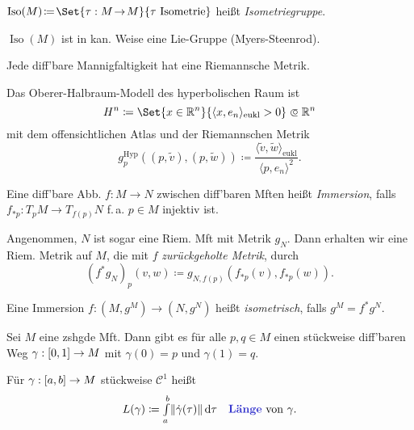 \documentclass{cheat-sheet}
\newcommand{\abinterval}{\cinterval{a}{b}} %
\DeclareMathOperator{\Iso}{Iso} %
\newcommand{\Cont}{\mathcal{C}} %
\begin{document}
\begin{defn}
  $\Iso(M) \!\coloneqq\! \Set{ \tau : M \!\to\! M }{ \tau \text{ Isometrie} }$ heißt \emph{Isometriegruppe}.
\end{defn}

\begin{bem}
  $\Iso(M)$ ist in kan. Weise eine Lie-Gruppe (Myers-Steenrod).
\end{bem}

\begin{satz}
  Jede diff'bare Mannigfaltigkeit hat eine Riemannsche Metrik.
\end{satz}

\begin{bsp}
  Das Oberer-Halbraum-Modell des hyperbolischen Raum ist
  \[ H^n \coloneqq \Set{x \in \R^n}{\langle x, e_n \rangle_{\text{eukl}} > 0} \opn \R^n \]
  mit dem offensichtlichen Atlas und der Riemannschen Metrik
  \[ g_p^{\text{Hyp}} ((p, \tilde{v}), (p, \tilde{w})) \coloneqq \frac{\langle \tilde{v}, \tilde{w} \rangle_{\text{eukl}}}{\langle p, e_n \rangle^2}. \]
\end{bsp}

\begin{defn}
  Eine diff'bare Abb. $f : M \to N$ zwischen diff'baren Mften heißt \emph{Immersion}, falls $f_{*p} : T_p M \to T_{f(p)} N$ f.\,a. $p \in M$ injektiv ist.
\end{defn}

\begin{defn}
  Angenommen, $N$ ist sogar eine Riem. Mft mit Metrik $g_N$. Dann erhalten wir eine Riem. Metrik auf $M$, die mit $f$ \emph{zurückgeholte Metrik}, durch
  \[ (f^* g_N)_p (v, w) \coloneqq g_{N,f(p)}(f_{*p}(v), f_{*p}(w)). \]
\end{defn}

\begin{defn}
  Eine Immersion $f : (M, g^M) \to (N, g^N)$ heißt \emph{isometrisch}, falls $g^M = f^* g^N$.
\end{defn}

\begin{prop}
  Sei $M$ eine zshgde Mft. Dann gibt es für alle $p, q \in M$ einen stückweise diff'baren Weg $\gamma : \left[ 0, 1 \right] \to M$ mit $\gamma(0) = p$ und $\gamma(1) = q$.
\end{prop}

\begin{defn}
  Für $\gamma : \abinterval \to M$ stückweise $\Cont^1$ heißt
  \[
    L(\gamma) \coloneqq \Int{a}{b}{\norm{\dot{\gamma}(\tau)}}{\tau}
    \quad \text{\emph{Länge} von $\gamma$.}
  \]
\end{defn}
\end{document}
